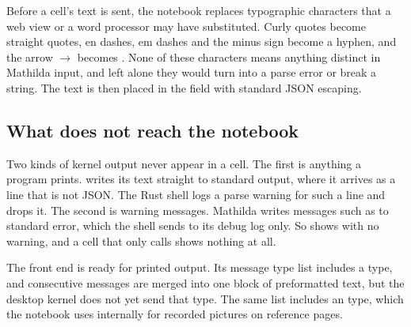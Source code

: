 Before a cell's text is sent, the notebook replaces typographic characters
that a web view or a word processor may have substituted. Curly quotes become
straight quotes, en dashes, em dashes and the minus sign become a hyphen, and
the arrow \(\rightarrow\) becomes \mcode{->}. None of these characters means
anything distinct in Mathilda input, and left alone they would turn
\mcode{->} into a parse error or break a string. The text is then placed in
the  field with standard JSON escaping.%

\subsection{What does not reach the notebook}
\label{ssec:nb-lost}

Two kinds of kernel output never appear in a cell. The first is anything a
program prints.  writes its text straight to standard output, where
it arrives as a line that is not JSON. The Rust shell logs a parse warning for
such a line and drops it. The second is warning messages. Mathilda writes
messages such as  to standard error, which the shell sends
to its debug log only. So  shows  with no
warning, and a cell that only calls  shows nothing at all.

The front end is ready for printed output. Its message type list includes a
 type, and consecutive  messages are merged into
one block of preformatted text, but the desktop kernel does not yet send that
type. The same list includes an  type, which the notebook uses
internally for recorded pictures on reference pages.%

